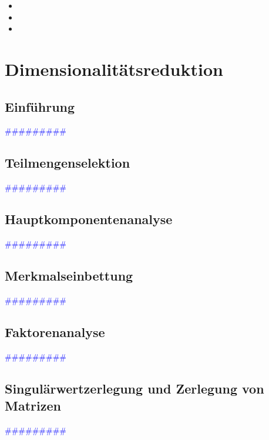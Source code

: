 \documentclass{article}
\begin{document}
      \begin{itemize}
      \color{ForestGreen}
        \item
        \item
        \item
      \end{itemize}



\newpage
\section{Dimensionalitätsreduktion} %
  \subsection{Einführung} %
      \textcolor{blue}{\#\#\#\#\#\#\#\#\#}
  \subsection{Teilmengenselektion} %
      \textcolor{blue}{\#\#\#\#\#\#\#\#\#}
  \subsection{Hauptkomponentenanalyse} %
      \textcolor{blue}{\#\#\#\#\#\#\#\#\#}
  \subsection{Merkmalseinbettung} %
      \textcolor{blue}{\#\#\#\#\#\#\#\#\#}
  \subsection{Faktorenanalyse} %
      \textcolor{blue}{\#\#\#\#\#\#\#\#\#}
  \subsection{Singulärwertzerlegung und Zerlegung von Matrizen} %
      \textcolor{blue}{\#\#\#\#\#\#\#\#\#}
\end{document}
